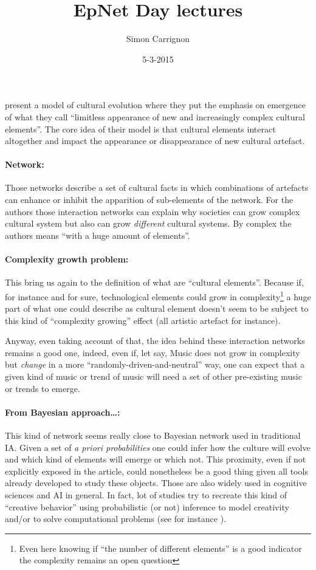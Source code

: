 \documentclass[a4paper]{article}
\title{EpNet Day lectures}
\author{Simon Carrignon}
\date{5-3-2015}
\begin{document}
\maketitle

\cite{enquist2011modellingtheevolutionanddiversityofcumulativeculture} present a model of cultural evolution where they put the emphasis on emergence of what they call ``limitless appearance of new and increasingly complex cultural elements''. The core idea of their model is that cultural elements interact altogether and impact the appearance or disappearance of new cultural artefact. 


\paragraph{Network:\\}
Those networks describe a set of cultural facts in which combinations of artefacts can enhance or inhibit the apparition of sub-elements of the network. For the authors those interaction networks can explain why societies can grow complex cultural system but also can grow \emph{different} cultural systems. By complex the authors means ``with a huge amount of elements''. 


\paragraph{Complexity growth problem:\\}
This bring us again to the definition of what are ``cultural elements''. Because if, for instance and for sure, technological elements could grow in complexity\footnote{Even here knowing if ``the number of different elements'' is a good indicator the complexity remains an open question} a huge part of what one could describe as cultural element doesn't seem to be subject to this kind of ``complexity growing'' effect (all artistic artefact for instance). 

Anyway, even taking account of that, the idea behind these interaction networks remains a good one, indeed, even if, let say, Music does not grow in complexity but \emph{change} in a more ``randomly-driven-and-neutral'' way, one can expect that a given kind of music or trend of music will need a set of other pre-existing music or trends to emerge.

\paragraph{From Bayesian approach\ldots:\\}
This kind of network seems really close to Bayesian network used in traditional IA. Given a set of \emph{a priori probabilities} one could infer how the culture will evolve and which kind of elements will emerge or which not. This proximity, even if not explicitly exposed in the article, could nonetheless be a good thing given all tools already developed to study these objects. Those are also widely used in cognitive sciences and AI in general. In fact, lot of studies try to recreate this kind of ``creative behavior'' using probabilistic (or not) inference to model creativity and/or to solve computational problems (see for instance \cite{pereira2007creativity}).
\end{document}
